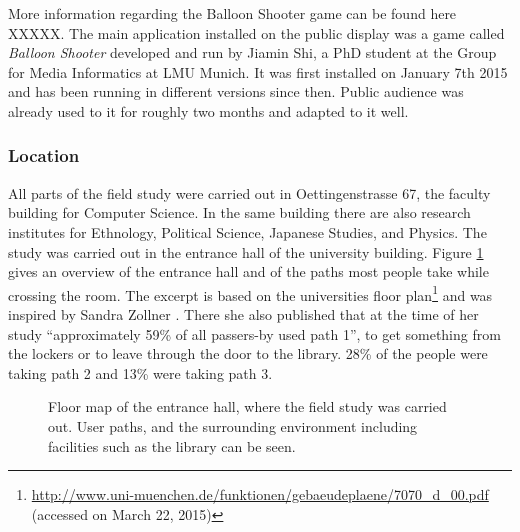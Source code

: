 
		More information regarding the Balloon Shooter game can be found here XXXXX. 
		The main application installed on the public display was a game called \textit{Balloon Shooter} developed and run by Jiamin Shi, a PhD student at the Group for Media Informatics at LMU Munich. It was first installed on January 7th 2015 and has been running in different versions since then. Public audience was already used to it for roughly two months and adapted to it well.




	\subsubsection{Location}

	All parts of the field study were carried out in Oettingenstrasse 67, the faculty building for Computer Science. In the same building there are also research institutes for Ethnology, Political Science, Japanese Studies, and Physics. The study was carried out in the entrance hall of the university building. Figure \ref{fig:5-entrance-hall} gives an overview of the entrance hall and of the paths most people take while crossing the room. The excerpt is based on the universities floor plan\footnote{\url{http://www.uni-muenchen.de/funktionen/gebaeudeplaene/7070_d_00.pdf} (accessed on March 22, 2015)} and was inspired by Sandra Zollner \cite{zollner2014thesis}. There she also published that at the time of her study ``approximately 59\% of all passers-by used path 1'', to get something from the lockers or to leave through the door to the library. 28\% of the people were taking path 2 and 13\% were taking path 3.

	\begin{figure}
	    \begin{center}
	    \end{center}
	 \caption[Floor Map of Entrance Hall]{Floor map of the entrance hall, where the field study was carried out. User paths, and the surrounding environment including facilities such as the library can be seen.}
	 \label{fig:5-entrance-hall}
	\end{figure}

